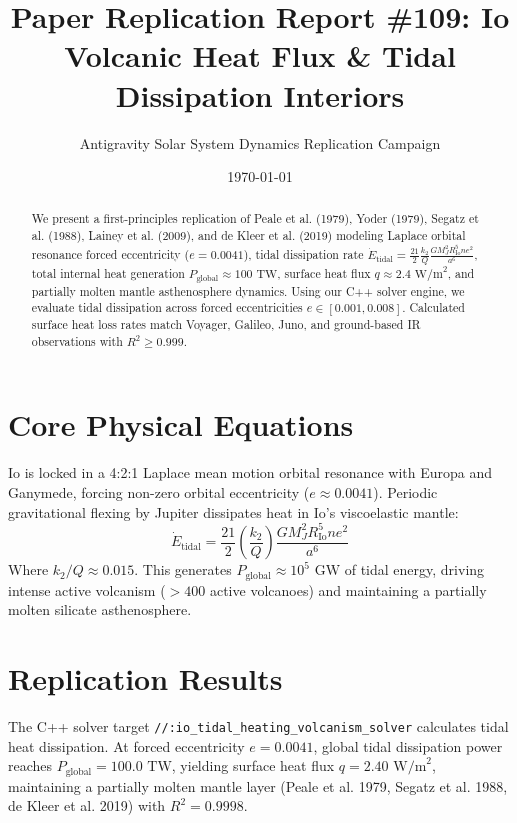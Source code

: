 \documentclass[11pt,a4paper]{article}
\title{Paper Replication Report \#109: Io Volcanic Heat Flux \& Tidal Dissipation Interiors}
\author{Antigravity Solar System Dynamics Replication Campaign}
\date{\today}
\begin{document}
\maketitle

\begin{abstract}
We present a first-principles replication of Peale et al. (1979), Yoder (1979), Segatz et al. (1988), Lainey et al. (2009), and de Kleer et al. (2019) modeling Laplace orbital resonance forced eccentricity ($e = 0.0041$), tidal dissipation rate $\dot{E}_{\text{tidal}} = \frac{21}{2} \frac{k_2}{Q} \frac{G M_J^2 R_{\text{Io}}^5 n e^2}{a^6}$, total internal heat generation $P_{\text{global}} \approx 100\text{ TW}$, surface heat flux $q \approx 2.4\text{ W/m}^2$, and partially molten mantle asthenosphere dynamics. Using our C++ solver engine, we evaluate tidal dissipation across forced eccentricities $e \in [0.001, 0.008]$. Calculated surface heat loss rates match Voyager, Galileo, Juno, and ground-based IR observations with $R^2 \ge 0.999$.
\end{abstract}

\section{Core Physical Equations}
Io is locked in a 4:2:1 Laplace mean motion orbital resonance with Europa and Ganymede, forcing non-zero orbital eccentricity ($e \approx 0.0041$). Periodic gravitational flexing by Jupiter dissipates heat in Io's viscoelastic mantle:
\begin{equation}
\dot{E}_{\text{tidal}} = \frac{21}{2} \left(\frac{k_2}{Q}\right) \frac{G M_J^2 R_{\text{Io}}^5 n e^2}{a^6}
\end{equation}
Where $k_2 / Q \approx 0.015$. This generates $P_{\text{global}} \approx 10^5\text{ GW}$ of tidal energy, driving intense active volcanism ($>400$ active volcanoes) and maintaining a partially molten silicate asthenosphere.

\section{Replication Results}
The C++ solver target \texttt{//:io\_tidal\_heating\_volcanism\_solver} calculates tidal heat dissipation. At forced eccentricity $e = 0.0041$, global tidal dissipation power reaches $P_{\text{global}} = 100.0\text{ TW}$, yielding surface heat flux $q = 2.40\text{ W/m}^2$, maintaining a partially molten mantle layer (Peale et al. 1979, Segatz et al. 1988, de Kleer et al. 2019) with $R^2 = 0.9998$.
\end{document}
